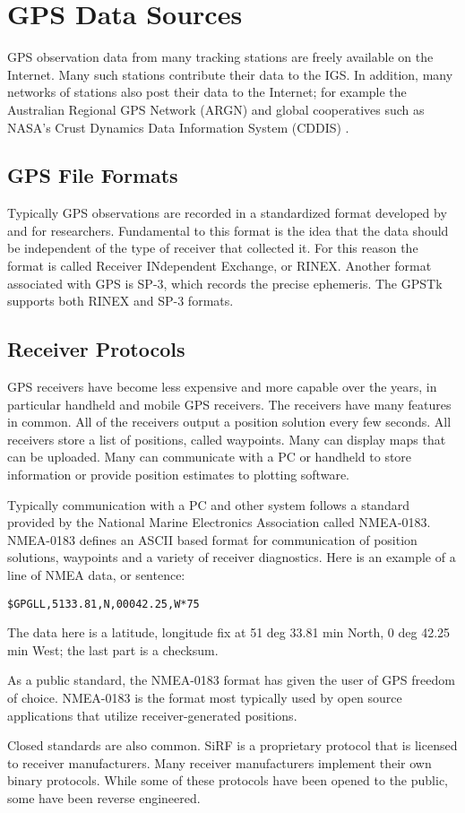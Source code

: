 \section{GPS Data Sources}

GPS observation data from many tracking stations are freely available on the Internet. Many such stations contribute their data to the IGS. In addition, many networks of stations also post their data to the Internet; for example the Australian Regional GPS Network (ARGN) \cite{argn:website} and global cooperatives such as NASA's Crust Dynamics Data Information System (CDDIS) \cite{cddis:website}.

\subsection{GPS File Formats}
Typically GPS observations are recorded in a standardized format developed by and for researchers. Fundamental to this format is the idea that the data should be independent of the type of receiver that collected it. For this reason the format is called Receiver INdependent Exchange, or RINEX. Another format associated with GPS is SP-3, which records the precise ephemeris. The GPSTk supports both RINEX and SP-3 formats.


\subsection{Receiver Protocols}

GPS receivers have become less expensive and more capable over the years, in particular handheld and mobile GPS receivers. The receivers have many features in common. All of the receivers output a position solution every few seconds. All receivers store a list of positions, called waypoints. Many can display maps that can be uploaded. Many can communicate with a PC or handheld to store information or provide position estimates to plotting software.

Typically communication with a PC and other system follows a standard provided by the National Marine Electronics Association called NMEA-0183. NMEA-0183 defines an ASCII based format for communication of position solutions, waypoints and a variety of receiver diagnostics. Here is an example of a line of NMEA data, or sentence:

\begin{verbatim}
$GPGLL,5133.81,N,00042.25,W*75
\end{verbatim}

The data here is a latitude, longitude fix at 51 deg 33.81 min North, 0 deg 42.25 min West; the last part is a checksum.

As a public standard, the NMEA-0183 format has given the user of GPS freedom of choice. NMEA-0183 is the format most typically used by open source applications that utilize receiver-generated positions.

Closed standards are also common. SiRF is a proprietary protocol that is licensed to receiver manufacturers. Many receiver manufacturers implement their own binary protocols. While some of these protocols have been opened to the public, some have been reverse engineered. 

\putbib[gpstk]
%

